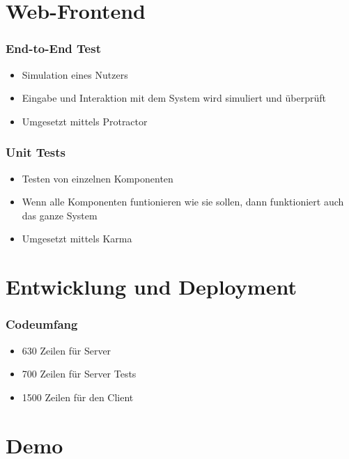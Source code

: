 \documentclass{beamer}
\begin{document}
\section{Web-Frontend}
\begin{frame}
    \frametitle{End-to-End Test}
    \begin{itemize}
        \item Simulation eines Nutzers
        \item Eingabe und Interaktion mit dem System wird simuliert und überprüft
        \item Umgesetzt mittels Protractor
    \end{itemize}
\end{frame}
\begin{frame}
    \frametitle{Unit Tests}
    \begin{itemize}
        \item Testen von einzelnen Komponenten
        \item Wenn alle Komponenten funtionieren wie sie sollen, dann funktioniert auch das ganze System
        \item Umgesetzt mittels Karma
    \end{itemize}
\end{frame}

\section{Entwicklung und Deployment}
\begin{frame}
    \frametitle{Codeumfang}
    \begin{itemize}
        \item 630 Zeilen für Server
        \item 700 Zeilen für Server Tests
        \item 1500 Zeilen für den Client
    \end{itemize}
\end{frame}
\section{Demo}
\end{document}
